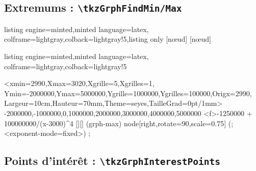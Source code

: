 \documentclass[11pt,a4paper]{ltxdoc}
\begin{document}
\subsection{Extremums : \texttt{\textbackslash tkzGrphFindMin/Max}}

\begin{tcblisting}{listing engine=minted,minted language=latex,
  colframe=lightgray,colback=lightgray!5,listing only}
[nœud]
[nœud]
\end{tcblisting}

\begin{tcblisting}{listing engine=minted,minted language=latex,
  colframe=lightgray,colback=lightgray!5}
\begin{tkzGrph}%
  <xmin=2990,Xmax=3020,Xgrille=5,Xgrilles=1,%
  Ymin=-2000000,Ymax=5000000,Ygrille=1000000,Ygrilles=100000,Origx=2990,%
  Largeur=10cm,Hauteur=70mm,Theme=seyes,TailleGrad=0pt/1mm>
  {-2000000,-1000000,0,1000000,2000000,3000000,4000000,5000000}
  \tkzGrphDefineCurve[name=cf,trace,forbiddenvalues={3000}]%
    <f>{-1250000 + 100000000/(x-3000)^4}
  [\mylocalxmax][\mylocalymax]
  \draw[teal] (grph-max) node[right,rotate=90,scale=0.75] {(\ArrondirNum[0]{\mylocalxmax};\ArrondirNum[0]<exponent-mode=fixed>{\mylocalymax})} ;
\end{tkzGrph}
\end{tcblisting}

\subsection{Points d'intérêt : \texttt{\textbackslash tkzGrphInterestPoints}}
\end{document}
